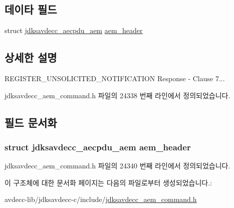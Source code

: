 \subsection*{데이타 필드}
\begin{DoxyCompactItemize}
\item 
struct \hyperlink{structjdksavdecc__aecpdu__aem}{jdksavdecc\+\_\+aecpdu\+\_\+aem} \hyperlink{structjdksavdecc__aem__command__register__unsolicited__notification__response_ae1e77ccb75ff5021ad923221eab38294}{aem\+\_\+header}
\end{DoxyCompactItemize}


\subsection{상세한 설명}
R\+E\+G\+I\+S\+T\+E\+R\+\_\+\+U\+N\+S\+O\+L\+I\+C\+I\+T\+E\+D\+\_\+\+N\+O\+T\+I\+F\+I\+C\+A\+T\+I\+ON Response -\/ Clause 7... 

jdksavdecc\+\_\+aem\+\_\+command.\+h 파일의 24338 번째 라인에서 정의되었습니다.



\subsection{필드 문서화}
\subsubsection[{\texorpdfstring{aem\+\_\+header}{aem_header}}]{\setlength{\rightskip}{0pt plus 5cm}struct {\bf jdksavdecc\+\_\+aecpdu\+\_\+aem} aem\+\_\+header}\hypertarget{structjdksavdecc__aem__command__register__unsolicited__notification__response_ae1e77ccb75ff5021ad923221eab38294}{}\label{structjdksavdecc__aem__command__register__unsolicited__notification__response_ae1e77ccb75ff5021ad923221eab38294}


jdksavdecc\+\_\+aem\+\_\+command.\+h 파일의 24340 번째 라인에서 정의되었습니다.



이 구조체에 대한 문서화 페이지는 다음의 파일로부터 생성되었습니다.\+:\begin{DoxyCompactItemize}
\item 
avdecc-\/lib/jdksavdecc-\/c/include/\hyperlink{jdksavdecc__aem__command_8h}{jdksavdecc\+\_\+aem\+\_\+command.\+h}\end{DoxyCompactItemize}
